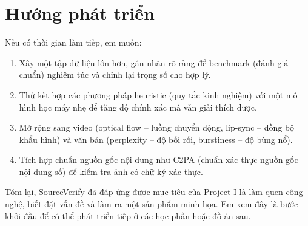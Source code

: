 \documentclass[14pt,a4paper,oneside]{report}
\begin{document}
\section{Hướng phát triển}
Nếu có thời gian làm tiếp, em muốn:
\begin{enumerate}
  \item Xây một tập dữ liệu lớn hơn, gán nhãn rõ ràng để benchmark (đánh giá chuẩn) nghiêm túc và chỉnh lại trọng số cho hợp lý.
  \item Thử kết hợp các phương pháp heuristic (quy tắc kinh nghiệm) với một mô hình học máy nhẹ để tăng độ chính xác mà vẫn giải thích được.
  \item Mở rộng sang video (optical flow -- luồng chuyển động, lip-sync -- đồng bộ khẩu hình) và văn bản (perplexity -- độ bối rối, burstiness -- độ bùng nổ).
  \item Tích hợp chuẩn nguồn gốc nội dung như C2PA (chuẩn xác thực nguồn gốc nội dung số) để kiểm tra ảnh có chữ ký xác thực.
\end{enumerate}

Tóm lại, SourceVerify đã đáp ứng được mục tiêu của Project I là làm quen công nghệ, biết đặt vấn đề và làm ra một sản phẩm minh họa. Em xem đây là bước khởi đầu để có thể phát triển tiếp ở các học phần hoặc đồ án sau.

\clearpage
\end{document}
